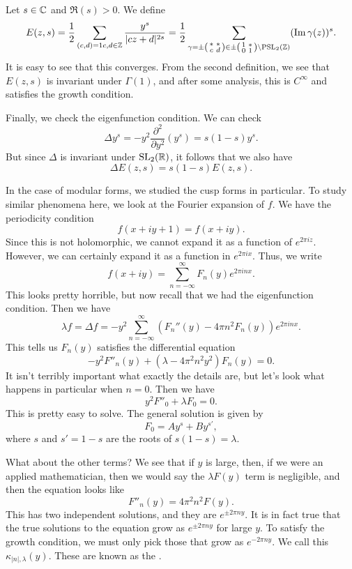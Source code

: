 \documentclass[a4paper]{article}
\begin{document}
\begin{eg}
  Let $s \in \mathbb{C}$ and $\Re(s) > 0$. We define
  \[
    E(z, s) = \frac{1}{2} \sum_{\substack{(c, d) = 1}{c, d \in \mathbb{Z}}} \frac{y^s}{|cz + d|^{2s}} = \frac{1}{2} \sum_{\gamma = \pm \begin{psmallmatrix}* & *\\c & d\end{psmallmatrix} \in \pm \begin{psmallmatrix}1 & *\\0 & 1\end{psmallmatrix} \backslash \mathrm{PSL}_2(\mathbb{Z})} (\operatorname{Im} \gamma(z))^s.
  \]
  It is easy to see that this converges. From the second definition, we see that $E(z, s)$ is invariant under $\Gamma(1)$, and after some analysis, this is $C^\infty$ and satisfies the growth condition.

  Finally, we check the eigenfunction condition. We can check
  \[
    \Delta y^s = -y^2 \frac{\partial^2}{\partial y^2} (y^s) = s(1 - s) y^s.
  \]
  But since $\Delta$ is invariant under $\mathrm{SL}_2(\mathbb{R})$, it follows that we also have
  \[
    \Delta E(z, s) = s(1 - s) E(z, s).
  \]
\end{eg}

In the case of modular forms, we studied the cusp forms in particular. To study similar phenomena here, we look at the Fourier expansion of $f$. We have the periodicity condition
\[
  f(x + iy + 1) = f(x + iy).
\]
Since this is not holomorphic, we cannot expand it as a function of $e^{2\pi iz}$. However, we can certainly expand it as a function in $e^{2\pi i x}$. Thus, we write
\[
  f(x + iy) = \sum_{n = -\infty}^\infty F_n(y) e^{2\pi i n x}.
\]
This looks pretty horrible, but now recall that we had the eigenfunction condition. Then we have
\[
  \lambda f = \Delta f = -y^2 \sum_{n= -\infty}^\infty (F_n''(y) - 4 \pi n^2 F_n(y))e^{2\pi i nx}.
\]
This tells us $F_n(y)$ satisfies the differential equation
\[
  -y^2 F''_n(y) + (\lambda - 4\pi^2 n^2 y^2) F_n(y) = 0.\tag{$*$}
\]
It isn't terribly important what exactly the details are, but let's look what happens in particular when $n = 0$. Then we have
\[
  y^2 F''_0 + \lambda F_0 = 0.
\]
This is pretty easy to solve. The general solution is given by
\[
  F_0 = Ay^s + B y^{s'},
\]
where $s$ and $s' = 1 - s$ are the roots of $s(1 - s) = \lambda$.

What about the other terms? We see that if $y$ is large, then, if we were an applied mathematician, then we would say the $\lambda F(y)$ term is negligible, and then the equation looks like
\[
  F''_n(y) = 4\pi^2 n^2 F(y).
\]
This has two independent solutions, and they are $e^{\pm 2\pi n y}$. It is in fact true that the true solutions to the equation grow as $e^{\pm 2 \pi n y}$ for large $y$. To satisfy the growth condition, we must only pick those that grow as $e^{-2\pi n y}$. We call this $\kappa_{|n|, \lambda}(y)$. These are known as the .
\end{document}
